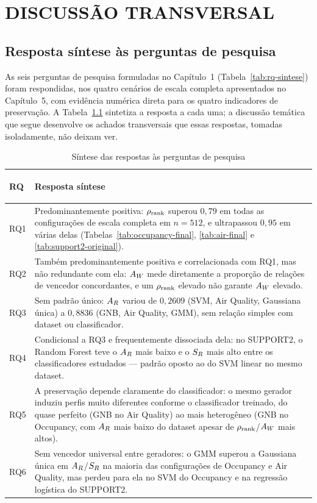 \chapter{DISCUSSÃO TRANSVERSAL}
\label{chap:discussao}

\section{Resposta síntese às perguntas de pesquisa}

As seis perguntas de pesquisa formuladas no Capítulo~1 (Tabela~\ref{tab:rq-sintese}) foram respondidas, nos quatro cenários de escala completa apresentados no Capítulo~5, com evidência numérica direta para os quatro indicadores de preservação. A Tabela~\ref{tab:rq-resposta} sintetiza a resposta a cada uma; a discussão temática que segue desenvolve os achados transversais que essas respostas, tomadas isoladamente, não deixam ver.

\begin{table}[H]
  \centering
  \caption{Síntese das respostas às perguntas de pesquisa}
  \label{tab:rq-resposta}
  \begin{tabularx}{\textwidth}{>{\bfseries\raggedright\arraybackslash}p{1.35cm}X}
    \toprule
    RQ & Resposta síntese \\
    \midrule
    RQ1 & Predominantemente positiva: $\rho_{\mathrm{rank}}$ superou $0{,}79$ em todas as configurações de escala completa em $n=512$, e ultrapassou $0{,}95$ em várias delas (Tabelas~\ref{tab:occupancy-final}, \ref{tab:air-final} e \ref{tab:support2-original}). \\
    RQ2 & Também predominantemente positiva e correlacionada com RQ1, mas não redundante com ela: $A_W$ mede diretamente a proporção de relações de vencedor concordantes, e um $\rho_{\mathrm{rank}}$ elevado não garante $A_W$ elevado. \\
    RQ3 & Sem padrão único: $A_R$ variou de $0{,}2609$ (SVM, Air Quality, Gaussiana única) a $0{,}8836$ (GNB, Air Quality, GMM), sem relação simples com dataset ou classificador. \\
    RQ4 & Condicional a RQ3 e frequentemente dissociada dela: no SUPPORT2, o Random Forest teve o $A_R$ mais baixo e o $S_R$ mais alto entre os classificadores estudados --- padrão oposto ao do SVM linear no mesmo dataset. \\
    RQ5 & A preservação depende claramente do classificador: o mesmo gerador induziu perfis muito diferentes conforme o classificador treinado, do quase perfeito (GNB no Air Quality) ao mais heterogêneo (GNB no Occupancy, com $A_R$ mais baixo do dataset apesar de $\rho_{\mathrm{rank}}$/$A_W$ mais altos). \\
    RQ6 & Sem vencedor universal entre geradores: o GMM superou a Gaussiana única em $A_R$/$S_R$ na maioria das configurações de Occupancy e Air Quality, mas perdeu para ela no SVM do Occupancy e na regressão logística do SUPPORT2. \\
    \bottomrule
  \end{tabularx}
\end{table}

